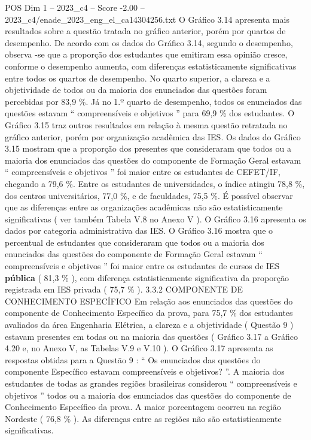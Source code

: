 \begin{textsample}{POS Dim 1 – 2023\_c4 – Score -2.00 – 2023\_c4/enade\_2023\_eng\_el\_ca14304256.txt}
O Gráfico 3.14 apresenta mais resultados sobre a questão tratada no gráfico anterior, porém por quartos de desempenho.
De acordo com os dados do Gráfico 3.14, segundo o desempenho, observa -se que a proporção dos estudantes que emitiram essa opinião cresce, conforme o desempenho aumenta, com diferenças estatisticamente significativas entre todos os quartos de desempenho.
No quarto superior, a clareza e a objetividade de todos ou da maioria dos enunciados das questões foram percebidas por 83,9 \%.
Já no 1.º quarto de desempenho, todos os enunciados das questões estavam “ compreensíveis e objetivos ” para 69,9 \% dos estudantes.
O Gráfico 3.15 traz outros resultados em relação à mesma questão retratada no gráfico anterior, porém por organização acadêmica das IES.
Os dados do Gráfico 3.15 mostram que a proporção dos presentes que consideraram que todos ou a maioria dos enunciados das questões do componente de Formação Geral estavam “ compreensíveis e objetivos ” foi maior entre os estudantes de CEFET/IF, chegando a 79,6 \%.
Entre os estudantes de universidades, o índice atingiu 78,8 \%, dos centros universitários, 77,0 \%, e de faculdades, 75,5 \%.
É possível observar que as diferenças entre as organizações acadêmicas não são estatisticamente significativas ( ver também Tabela V.8 no Anexo V ).
O Gráfico 3.16 apresenta os dados por categoria administrativa das IES.
O Gráfico 3.16 mostra que o percentual de estudantes que consideraram que todos ou a maioria dos enunciados das questões do componente de Formação Geral estavam “ compreensíveis e objetivos ” foi maior entre os estudantes de cursos de IES \textbf{pública} ( 81,3 \% ), com diferença estatisticamente significativa da proporção registrada em IES privada ( 75,7 \% ). 3.3.2 COMPONENTE DE CONHECIMENTO ESPECÍFICO Em relação aos enunciados das questões do componente de Conhecimento Específico da prova, para 75,7 \% dos estudantes avaliados da área Engenharia Elétrica, a clareza e a objetividade ( Questão 9 ) estavam presentes em todas ou na maioria das questões ( Gráfico 3.17 a Gráfico 4.20 e, no Anexo V, as Tabelas V.9 e V.10 ).
O Gráfico 3.17 apresenta as respostas obtidas para a Questão 9 : “ Os enunciados das questões do componente Específico estavam compreensíveis e objetivos? ”.
A maioria dos estudantes de todas as grandes regiões brasileiras considerou “ compreensíveis e objetivos ” todos ou a maioria dos enunciados das questões do componente de Conhecimento Específico da prova.
A maior porcentagem ocorreu na região Nordeste ( 76,8 \% ).
As diferenças entre as regiões não são estatisticamente significativas.

\end{textsample}
